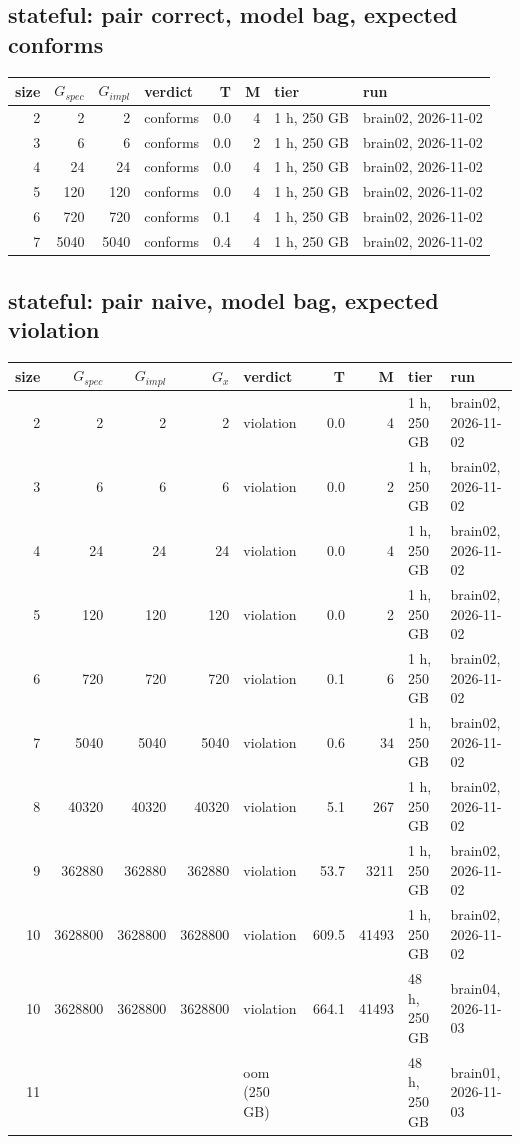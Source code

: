 \documentclass[10pt]{article}
\begin{document}
\subsection*{stateful: pair \textsf{correct}, model bag, expected conforms}
\begin{longtable}{@{}rrrlrrll@{}}
\toprule
size & $G_{\mathit{spec}}$ & $G_{\mathit{impl}}$ & verdict & T & M & tier & run \\
\midrule
\endhead
\color{blue} 2 & 2 & 2 & conforms & 0.0 & 4 & 1 h, 250 GB & brain02, 2026-11-02 \\
\color{blue} 3 & 6 & 6 & conforms & 0.0 & 2 & 1 h, 250 GB & brain02, 2026-11-02 \\
\color{blue} 4 & 24 & 24 & conforms & 0.0 & 4 & 1 h, 250 GB & brain02, 2026-11-02 \\
\color{blue} 5 & 120 & 120 & conforms & 0.0 & 4 & 1 h, 250 GB & brain02, 2026-11-02 \\
\color{blue} 6 & 720 & 720 & conforms & 0.1 & 4 & 1 h, 250 GB & brain02, 2026-11-02 \\
\color{blue} 7 & 5040 & 5040 & conforms & 0.4 & 4 & 1 h, 250 GB & brain02, 2026-11-02 \\
\bottomrule
\end{longtable}
\subsection*{stateful: pair \textsf{naive}, model bag, expected violation}
\begin{longtable}{@{}rrrrlrrll@{}}
\toprule
size & $G_{\mathit{spec}}$ & $G_{\mathit{impl}}$ & $G_x$ & verdict & T & M & tier & run \\
\midrule
\endhead
\color{blue} 2 & 2 & 2 & 2 & violation & 0.0 & 4 & 1 h, 250 GB & brain02, 2026-11-02 \\
\color{blue} 3 & 6 & 6 & 6 & violation & 0.0 & 2 & 1 h, 250 GB & brain02, 2026-11-02 \\
\color{blue} 4 & 24 & 24 & 24 & violation & 0.0 & 4 & 1 h, 250 GB & brain02, 2026-11-02 \\
\color{blue} 5 & 120 & 120 & 120 & violation & 0.0 & 2 & 1 h, 250 GB & brain02, 2026-11-02 \\
\color{blue} 6 & 720 & 720 & 720 & violation & 0.1 & 6 & 1 h, 250 GB & brain02, 2026-11-02 \\
\color{blue} 7 & 5040 & 5040 & 5040 & violation & 0.6 & 34 & 1 h, 250 GB & brain02, 2026-11-02 \\
\color{blue} 8 & 40320 & 40320 & 40320 & violation & 5.1 & 267 & 1 h, 250 GB & brain02, 2026-11-02 \\
\color{blue} 9 & 362880 & 362880 & 362880 & violation & 53.7 & 3211 & 1 h, 250 GB & brain02, 2026-11-02 \\
\color{blue} 10 & 3628800 & 3628800 & 3628800 & violation & 609.5 & 41493 & 1 h, 250 GB & brain02, 2026-11-02 \\
\color{blue} 10 & 3628800 & 3628800 & 3628800 & violation & 664.1 & 41493 & 48 h, 250 GB & brain04, 2026-11-03 \\
\color{blue} 11 &  &  &  & oom (250 GB) &  &  & 48 h, 250 GB & brain01, 2026-11-03 \\
\bottomrule
\end{longtable}
\end{document}
